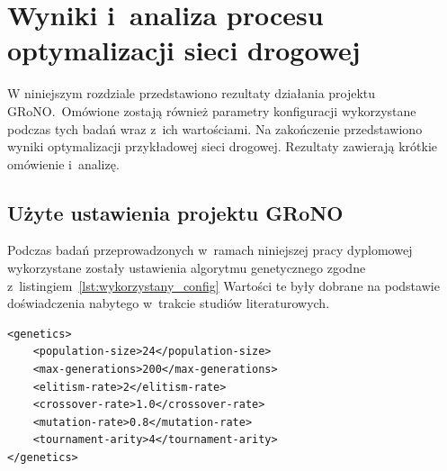 \documentclass[twoside,12pt]{report}
\let\oldsection\chapter
\def\chapter{\cleardoublepage\oldsection}
\begin{document}
\chapter{Wyniki i~analiza procesu optymalizacji sieci drogowej}\label{rozdz.grono-praktyka} 
W niniejszym rozdziale przedstawiono rezultaty działania projektu GRoNO.~Omówione zostają również parametry konfiguracji wykorzystane podczas tych badań wraz z~ich wartościami. Na zakończenie przedstawiono wyniki optymalizacji przykładowej sieci drogowej. Rezultaty zawierają krótkie omówienie i~analizę.

\section{Użyte ustawienia projektu GRoNO}
Podczas badań przeprowadzonych w~ramach niniejszej pracy dyplomowej wykorzystane zostały ustawienia algorytmu genetycznego zgodne z~listingiem~\ref{lst:wykorzystany_config} Wartości te były dobrane na podstawie doświadczenia nabytego w~trakcie studiów literaturowych. 
	
\begin{lstlisting}[caption=Ustawienia algorytmu genetycznego podczas badań, label=lst:wykorzystany_config]
<genetics>
	<population-size>24</population-size>
	<max-generations>200</max-generations>
	<elitism-rate>2</elitism-rate>
	<crossover-rate>1.0</crossover-rate>
	<mutation-rate>0.8</mutation-rate>
	<tournament-arity>4</tournament-arity>
</genetics>
\end{lstlisting}
\end{document}
